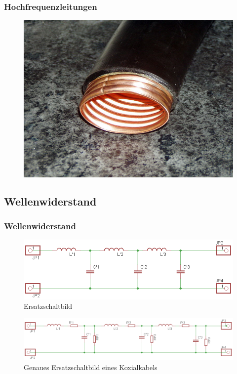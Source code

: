 \begin{frame}
\frametitle{Hochfrequenzleitungen}
\begin{center}
\begin{figure}
\includegraphics[width=1\textwidth,height=.7\textheight,keepaspectratio]{e10/hohl.jpg}
\end{figure}
\end{center}
\end{frame}

\subsection*{Wellen\-widerstand}
\begin{frame}
\frametitle{Wellenwiderstand}
\begin{figure}
\includegraphics[width=1\textwidth,height=.3\textheight,keepaspectratio]{e10/wellenesb.png}
\caption{Ersatzschaltbild}
\end{figure}
\begin{figure}
\includegraphics[width=1\textwidth,height=.3\textheight,keepaspectratio]{e10/wellenesbex.png}
\caption{Genaues Ersatzschaltbild eines Koxialkabels}
\end{figure}
\end{frame}

